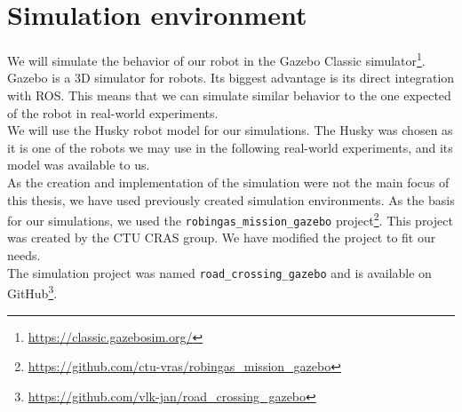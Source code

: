 \section{Simulation environment}
    We will simulate the behavior of our robot in the Gazebo Classic simulator\footnote{\url{https://classic.gazebosim.org/}}. Gazebo is a 3D simulator for robots. Its biggest advantage is its direct integration with ROS. This means that we can simulate similar behavior to the one expected of the robot in real-world experiments.\\
    We will use the Husky robot model for our simulations. The Husky was chosen as it is one of the robots we may use in the following real-world experiments, and its model was available to us.\\
    As the creation and implementation of the simulation were not the main focus of this thesis, we have used previously created simulation environments. As the basis for our simulations, we used the \texttt{robingas\_mission\_gazebo} project\footnote{\url{https://github.com/ctu-vras/robingas_mission_gazebo}}. This project was created by the CTU CRAS group. We have modified the project to fit our needs.\\
    The simulation project was named \texttt{road\_crossing\_gazebo} and is available on GitHub\footnote{\url{https://github.com/vlk-jan/road_crossing_gazebo}}.
